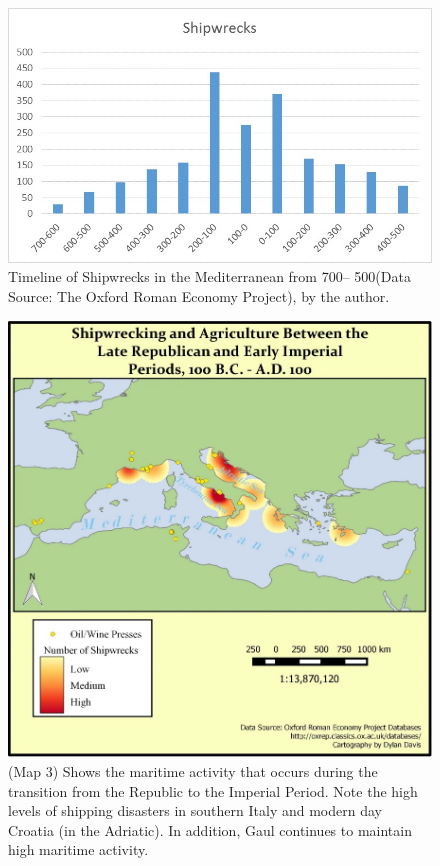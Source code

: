 	
	\begin{figure}[!p]
		\includegraphics[width=\linewidth]{figures/Davis_Agroeconomy_Fig2.jpg}
		\centering
		\caption{Timeline of Shipwrecks in the Mediterranean from 700\protect\BC -- 500\protect\AD (Data Source: The Oxford Roman Economy Project), by the author.}
		\label{fig:DavisFig2}
	\end{figure}
	
	
	\begin{figure}[!p]
		\includegraphics[width=\linewidth]{figures/Davis_Agroeconomy_Map3.jpg}
		\centering
		\caption{(Map 3) Shows the maritime activity that occurs during the transition from the Republic to the Imperial Period. Note the high levels of shipping disasters in southern Italy and modern day Croatia (in the Adriatic). In addition, Gaul continues to maintain high maritime activity.}
		\label{fig:DavisMap3}
	\end{figure}
	
